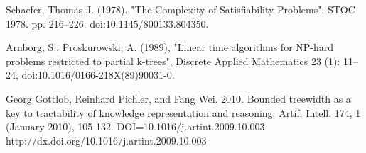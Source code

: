 \documentclass[12pt]{article}
\begin{document}
 Schaefer, Thomas J. (1978). "The Complexity of Satisfiability Problems". STOC 1978. pp. 216–226. doi:10.1145/800133.804350.

 Arnborg, S.; Proskurowski, A. (1989), "Linear time algorithms for NP-hard problems restricted to partial k-trees", Discrete Applied Mathematics 23 (1): 11–24, doi:10.1016/0166-218X(89)90031-0.

Georg Gottlob, Reinhard Pichler, and Fang Wei. 2010. Bounded treewidth as a key to tractability of knowledge representation and reasoning. Artif. Intell. 174, 1 (January 2010), 105-132. DOI=10.1016/j.artint.2009.10.003 http://dx.doi.org/10.1016/j.artint.2009.10.003

\endthebibliography
\end{document}

